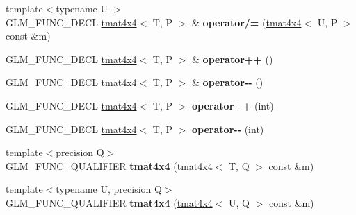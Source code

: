 \begin{DoxyCompactItemize}
\item 
{\footnotesize template$<$typename U $>$ }\\G\+L\+M\+\_\+\+F\+U\+N\+C\+\_\+\+D\+E\+CL \hyperlink{structglm_1_1detail_1_1tmat4x4}{tmat4x4}$<$ T, P $>$ \& {\bfseries operator/=} (\hyperlink{structglm_1_1detail_1_1tmat4x4}{tmat4x4}$<$ U, P $>$ const \&m)\hypertarget{structglm_1_1detail_1_1tmat4x4_a642293b379d24a91960b55e9eb2da91b}{}\label{structglm_1_1detail_1_1tmat4x4_a642293b379d24a91960b55e9eb2da91b}

\item 
G\+L\+M\+\_\+\+F\+U\+N\+C\+\_\+\+D\+E\+CL \hyperlink{structglm_1_1detail_1_1tmat4x4}{tmat4x4}$<$ T, P $>$ \& {\bfseries operator++} ()\hypertarget{structglm_1_1detail_1_1tmat4x4_a4d6675dbac8dc446236babedc6c2642c}{}\label{structglm_1_1detail_1_1tmat4x4_a4d6675dbac8dc446236babedc6c2642c}

\item 
G\+L\+M\+\_\+\+F\+U\+N\+C\+\_\+\+D\+E\+CL \hyperlink{structglm_1_1detail_1_1tmat4x4}{tmat4x4}$<$ T, P $>$ \& {\bfseries operator-\/-\/} ()\hypertarget{structglm_1_1detail_1_1tmat4x4_a6a724eae9119c2724ccfdb3f418ab31b}{}\label{structglm_1_1detail_1_1tmat4x4_a6a724eae9119c2724ccfdb3f418ab31b}

\item 
G\+L\+M\+\_\+\+F\+U\+N\+C\+\_\+\+D\+E\+CL \hyperlink{structglm_1_1detail_1_1tmat4x4}{tmat4x4}$<$ T, P $>$ {\bfseries operator++} (int)\hypertarget{structglm_1_1detail_1_1tmat4x4_afa478e500f09b50da702a53b3f788c0d}{}\label{structglm_1_1detail_1_1tmat4x4_afa478e500f09b50da702a53b3f788c0d}

\item 
G\+L\+M\+\_\+\+F\+U\+N\+C\+\_\+\+D\+E\+CL \hyperlink{structglm_1_1detail_1_1tmat4x4}{tmat4x4}$<$ T, P $>$ {\bfseries operator-\/-\/} (int)\hypertarget{structglm_1_1detail_1_1tmat4x4_a38f9e3d1a2d4b37646311ce7a798aacd}{}\label{structglm_1_1detail_1_1tmat4x4_a38f9e3d1a2d4b37646311ce7a798aacd}

\item 
{\footnotesize template$<$precision Q$>$ }\\G\+L\+M\+\_\+\+F\+U\+N\+C\+\_\+\+Q\+U\+A\+L\+I\+F\+I\+ER {\bfseries tmat4x4} (\hyperlink{structglm_1_1detail_1_1tmat4x4}{tmat4x4}$<$ T, Q $>$ const \&m)\hypertarget{structglm_1_1detail_1_1tmat4x4_aee39aabdc85b598efc2fa0f515bd7228}{}\label{structglm_1_1detail_1_1tmat4x4_aee39aabdc85b598efc2fa0f515bd7228}

\item 
{\footnotesize template$<$typename U, precision Q$>$ }\\G\+L\+M\+\_\+\+F\+U\+N\+C\+\_\+\+Q\+U\+A\+L\+I\+F\+I\+ER {\bfseries tmat4x4} (\hyperlink{structglm_1_1detail_1_1tmat4x4}{tmat4x4}$<$ U, Q $>$ const \&m)\hypertarget{structglm_1_1detail_1_1tmat4x4_acd4383cfa5e9463cb5d2e791b34a2a46}{}\label{structglm_1_1detail_1_1tmat4x4_acd4383cfa5e9463cb5d2e791b34a2a46}


\end{DoxyCompactItemize}
